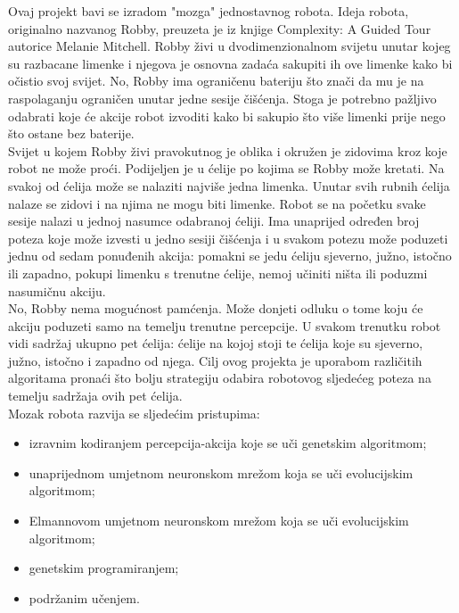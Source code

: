 \documentclass[times, utf8, numeric]{fer}
\begin{document}
Ovaj projekt bavi se izradom "mozga" jednostavnog robota. Ideja robota, originalno nazvanog Robby, preuzeta je iz knjige Complexity: A Guided Tour autorice Melanie Mitchell. Robby živi u dvodimenzionalnom svijetu unutar kojeg su razbacane limenke i njegova je osnovna zadaća sakupiti ih ove limenke kako bi očistio svoj svijet. No, Robby ima ograničenu bateriju što znači da mu je na raspolaganju ograničen unutar jedne sesije čišćenja. Stoga je potrebno pažljivo odabrati koje će akcije robot izvoditi kako bi sakupio što više limenki prije nego što ostane bez baterije.
\vspace{1ex}\\ 
Svijet u kojem Robby živi pravokutnog je oblika i okružen je zidovima kroz koje robot ne može proći. Podijeljen je u ćelije po kojima se Robby može kretati. Na svakoj od ćelija može se nalaziti najviše jedna limenka. Unutar svih rubnih ćelija nalaze se zidovi i na njima ne mogu biti limenke. Robot se na početku svake sesije nalazi u jednoj nasumce odabranoj ćeliji. Ima unaprijed određen broj poteza koje može izvesti u jedno sesiji čišćenja i u svakom potezu može poduzeti jednu od sedam ponuđenih akcija: pomakni se jedu ćeliju sjeverno, južno, istočno ili zapadno, pokupi limenku s trenutne ćelije, nemoj učiniti ništa ili poduzmi nasumičnu akciju.  
\vspace{1ex}\\
No, Robby nema mogućnost pamćenja. Može donjeti odluku o tome koju će akciju poduzeti samo na temelju trenutne percepcije. U svakom trenutku robot vidi sadržaj ukupno pet ćelija: ćelije na kojoj stoji te ćelija koje su sjeverno, južno, istočno i zapadno od njega. Cilj ovog projekta je uporabom različitih algoritama pronaći što bolju strategiju odabira robotovog sljedećeg poteza na temelju sadržaja ovih pet ćelija.
\vspace{1ex}\\
Mozak robota razvija se sljedećim pristupima:
\begin{itemize}
	\item izravnim kodiranjem percepcija-akcija koje se uči genetskim algoritmom;
	\item unaprijednom umjetnom neuronskom mrežom koja se uči evolucijskim algoritmom;
	\item Elmannovom umjetnom neuronskom mrežom koja se uči evolucijskim algoritmom;
	\item genetskim programiranjem;
	\item podržanim učenjem.
\end{itemize}
\vspace{1ex}
\end{document}
